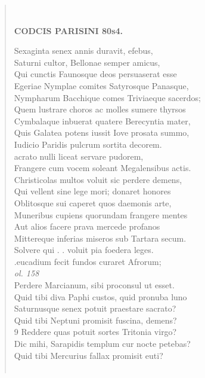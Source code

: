 \documentclass[11pt, a4paper]{report}
\begin{document}
\begin{verse}
        ﻿\pagebreak 
    \begin{center} \textbf{CODCIS PARISINI 80s4.} \end{center}Sexaginta senex annis duravit, efebus, \\ Saturni cultor, Bellonae semper amicus, \\ Qui cunctis Faunosque deos persuaserat esse \\ Egeriae Nymplae comites Satyrosque Panasque, \\ Nympharum Bacchique comes Triviaeque sacerdos; \\ Quem lustrare choros ac molles sumere thyrsos \\ Cymbalaque inbuerat quatere Berecyntia mater, \\ Quis Galatea potens iussit Iove prosata summo, \\ Iudicio Paridis pulcrum sortita decorem. \\ acrato nulli liceat servare pudorem, \\ Frangere cum vocem soleant Megalensibus actis. \\ Christicolas multos voluit sic perdere demens, \\ Qui vellent sine lege mori; donaret honores \\ Oblitosque sui caperet quos daemonis arte, \\ Muneribus cupiens quorundam frangere mentes \\ Aut alios facere prava mercede profanos \\ Mittereque inferias miseros sub Tartara secum. \\ Solvere qui . . voluit pia foedera leges. \\ .eucadium fecit fundos curaret Afrorum; \\ \textit{ol. 158} \\ Perdere Marcianum, sibi proconsul ut esset. \\ Quid tibi diva Paphi custos, quid pronuba luno \\ Saturnusque senex potuit praestare sacrato? \\ Quid tibi Neptuni promisit fuscina, demens? \\ 9 Reddere quas potuit sortes Tritonia virgo? \\ Dic mihi, Sarapidis templum cur nocte petebas? \\ Quid tibi Mercurius fallax promisit euti? \\ 
        ﻿\pagebreak 

\end{verse}
\end{document}

